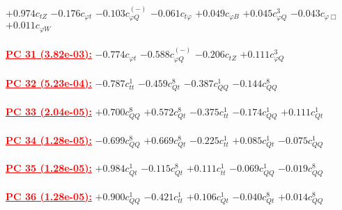 \documentclass{article}
\begin{document}
{$+0.974$}{\rm $c_{tZ}$}
{$-0.176$}{\rm $c_{\varphi t}$}
{$-0.103$}{\rm $c_{\varphi Q}^{(-)}$}
{$-0.061$}{\rm $c_{t \varphi}$}
{$+0.049$}{\rm $c_{\varphi B}$}
{$+0.045$}{\rm $c_{\varphi Q}^{3}$}
{$-0.043$}{\rm $c_{\varphi \Box}$}
{$+0.011$}{\rm $c_{\varphi W}$}
 \nonumber \\ \nonumber \\
\noindent \textcolor{red}{\underline{\bf{PC 31} (3.82e-03):}}
{$-0.774$}{\rm $c_{\varphi t}$}
{$-0.588$}{\rm $c_{\varphi Q}^{(-)}$}
{$-0.206$}{\rm $c_{tZ}$}
{$+0.111$}{\rm $c_{\varphi Q}^{3}$}
 \nonumber \\ \nonumber \\
\noindent \textcolor{red}{\underline{\bf{PC 32} (5.23e-04):}}
{$-0.787$}{\rm $c_{tt}^{1}$}
{$-0.459$}{\rm $c_{Qt}^{8}$}
{$-0.387$}{\rm $c_{QQ}^{1}$}
{$-0.144$}{\rm $c_{QQ}^{8}$}
 \nonumber \\ \nonumber \\
\noindent \textcolor{red}{\underline{\bf{PC 33} (2.04e-05):}}
{$+0.700$}{\rm $c_{QQ}^{8}$}
{$+0.572$}{\rm $c_{Qt}^{8}$}
{$-0.375$}{\rm $c_{tt}^{1}$}
{$-0.174$}{\rm $c_{QQ}^{1}$}
{$+0.111$}{\rm $c_{Qt}^{1}$}
 \nonumber \\ \nonumber \\
\noindent \textcolor{red}{\underline{\bf{PC 34} (1.28e-05):}}
{$-0.699$}{\rm $c_{QQ}^{8}$}
{$+0.669$}{\rm $c_{Qt}^{8}$}
{$-0.225$}{\rm $c_{tt}^{1}$}
{$+0.085$}{\rm $c_{Qt}^{1}$}
{$-0.075$}{\rm $c_{QQ}^{1}$}
 \nonumber \\ \nonumber \\
\noindent \textcolor{red}{\underline{\bf{PC 35} (1.28e-05):}}
{$+0.984$}{\rm $c_{Qt}^{1}$}
{$-0.115$}{\rm $c_{Qt}^{8}$}
{$+0.111$}{\rm $c_{tt}^{1}$}
{$-0.069$}{\rm $c_{QQ}^{1}$}
{$-0.019$}{\rm $c_{QQ}^{8}$}
 \nonumber \\ \nonumber \\
\noindent \textcolor{red}{\underline{\bf{PC 36} (1.28e-05):}}
{$+0.900$}{\rm $c_{QQ}^{1}$}
{$-0.421$}{\rm $c_{tt}^{1}$}
{$+0.106$}{\rm $c_{Qt}^{1}$}
{$-0.040$}{\rm $c_{Qt}^{8}$}
{$+0.014$}{\rm $c_{QQ}^{8}$}
 \nonumber \\ \nonumber \\
\end{document}
